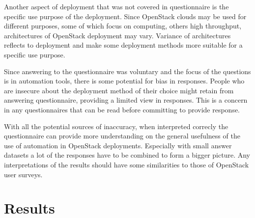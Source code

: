 Another aspect of deployment that was not covered in questionnaire is the
specific use purpose of the deployment. Since OpenStack clouds may be used for
different purposes, some of which focus on computing, others high throughput,
architectures of OpenStack deployment may vary. Variance of architectures
reflects to deployment and make some deployment methods more suitable for a
specific use purpose.

Since answering to the questionnaire was voluntary and the focus of the
questions is in automation tools, there is some potential for bias in
responses. People who are insecure about the deployment method of their choice
might retain from answering questionnaire, providing a limited view in
responses. This is a concern in any questionnaires that can be read before
committing to provide response.

With all the potential sources of inaccuracy, when interpreted correcly the
questionnaire can provide more understanding on the general usefulness of the
use of automation in OpenStack deployments. Especially with small answer
datasets a lot of the responses have to be combined to form a bigger picture.
Any interpretations of the results should have some similarities to those of
OpenStack user surveys.

\section{Results}

